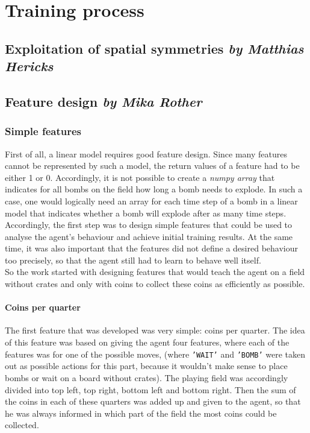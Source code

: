 \chapter{Training process}

\section[Exploitation of spatial symmetries]{Exploitation of spatial symmetries \hfill \small \normalfont\textit{by Matthias Hericks}}



\section[Feature design]{Feature design \hfill \small \normalfont\textit{by Mika Rother}} \label{sec:feature_design}
\subsection{Simple features}
First of all, a linear model requires good feature design. Since many features cannot be represented by such a model, the return values of a feature had to be either 1 or 0. Accordingly, it is not possible to create a \textit{numpy array} that indicates for all bombs on the field how long a bomb needs to explode. In such a case, one would logically need an array for each time step of a bomb in a linear model that indicates whether a bomb will explode after as many time steps.
\\

Accordingly, the first step was to design simple features that could be used to analyse the agent's behaviour and achieve initial training results. At the same time, it was also important that the features did not define a desired behaviour too precisely, so that the agent still had to learn to behave well itself. 
\\

So the work started with designing features that would teach the agent on a field without crates and only with coins to collect these coins as efficiently as possible.

\subsubsection*{Coins per quarter}
The first feature that was developed was very simple: coins per quarter. The idea of this feature was based on giving the agent four features, where each of the features was for one of the possible moves, (where \texttt{'WAIT'} and \texttt{'BOMB'} were taken out as possible actions for this part, because it wouldn't make sense to place bombs or wait on a board without crates). The playing field was accordingly divided into top left, top right, bottom left and bottom right. Then the sum of the coins in each of these quarters was added up and given to the agent, so that he was always informed in which part of the field the most coins could be collected. 
\\

